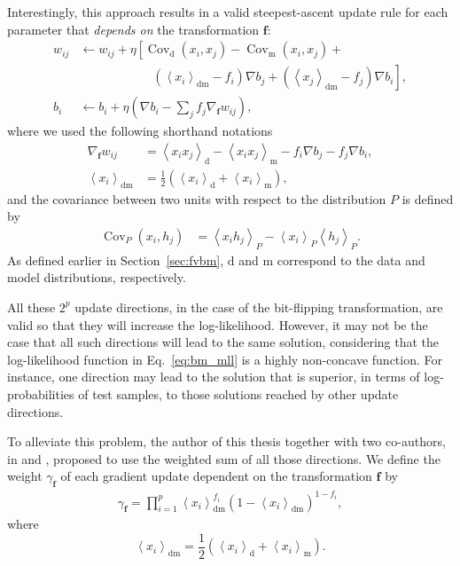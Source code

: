 \documentclass[dissertation,nocontribution,draft*]{aaltoseries}
\newcommand{\qexp}[1]{\left<#1\right>}
\newcommand{\vect}[1]{\mathbf{#1}}
\newcommand{\cov}[0]{\operatorname{Cov}}
\newcommand{\vf}[0]{\vect{f}}
\newcommand{\td}[0]{\text{d}}
\newcommand{\tf}[0]{\text{m}}
\newcommand{\tdf}[0]{\text{dm}}
\begin{document}
Interestingly, this approach results in a valid
steepest-ascent update rule for each parameter that
\textit{depends on} the transformation $\vf$:
\begin{align}
  w_{ij} &\leftarrow  w_{ij} + \eta
  \left[\cov_\td(x_i,x_j)-\cov_\tf(x_i,x_j) + \right.
  \nonumber \\
  &\phantom{\leftarrow w_{ij} + \eta
  \left[\right]}\left.\left(\left<x_i\right>_\tdf-f_i\right)
  \nabla b_j + \left(\left<x_j\right>_\tdf-f_j\right) \nabla
  b_i \right], 
\label{eq:threestepW}
\\
 b_i &\leftarrow  b_i + \eta\left( \nabla b_i - \sum_j f_j \nabla_\vf
      w_{ij} \right),
\label{eq:threestepb}
\end{align}
where we used the following shorthand notations
\begin{align*}
\nabla_\vf w_{ij} &= \left<x_ix_j\right>_\td -
\left<x_ix_j\right>_\tf - f_i\nabla b_j - f_j \nabla b_i, \\
\left< x_i \right>_{\tdf} &= \frac{1}{2} \left( \left< x_i
\right>_{\td} + \left< x_i \right>_{\tf} \right),
\end{align*}
and the covariance between two units with respect to the
distribution $P$ is defined by
\begin{align*}
  \cov_P\left(x_i, h_j\right) &= \qexp{x_i h_j}_P
   -\qexp{x_i}_P \qexp{h_j}_P.
\end{align*}
As defined earlier in Section~\ref{sec:fvbm}, $\td$ and
$\tf$ correspond to the data and model distributions,
respectively. 

All these $2^p$ update directions, in the case of
the bit-flipping transformation, are valid so that they will
increase the log-likelihood. However, it may not be the case
that all such directions will lead to the same solution,
considering that the log-likelihood function in
Eq.~\eqref{eq:bm_mll} is a highly non-concave function. For
instance, one direction may lead to the solution that is
superior, in terms of log-probabilities of test samples, to
those solutions reached by other update directions.

To alleviate this problem, the author of this thesis
together with two co-authors, in  and
, proposed to use the weighted sum of
all those directions. We define the weight $\gamma_{\vf}$ of
each gradient update dependent on the transformation $\vf$
by
\begin{align*}
    \gamma_{\vf}  = \prod_{i=1}^p \left< x_i
    \right>_{\tdf}^{f_i} \left(1 - \left< x_i
    \right>_{\tdf}\right)^{1 - f_i},
\end{align*}
where 
\[
\left< x_i \right>_{\tdf} = \frac{1}{2} \left( \left< x_i
\right>_{\td} + \left< x_i \right>_{\tf}\right).
\]
\end{document}
